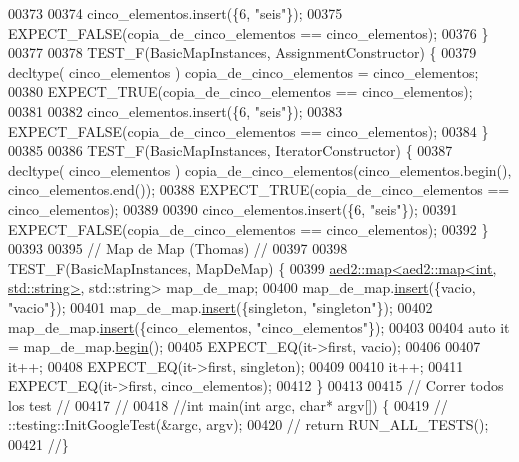 \begin{DoxyCode}
00373 
00374     cinco\_elementos.insert(\{6, \textcolor{stringliteral}{"seis"}\});
00375     EXPECT\_FALSE(copia\_de\_cinco\_elementos == cinco\_elementos);
00376 \}
00377 
00378 TEST\_F(BasicMapInstances, AssignmentConstructor) \{
00379     decltype( cinco\_elementos ) copia\_de\_cinco\_elementos = cinco\_elementos;
00380     EXPECT\_TRUE(copia\_de\_cinco\_elementos == cinco\_elementos);
00381 
00382     cinco\_elementos.insert(\{6, \textcolor{stringliteral}{"seis"}\});
00383     EXPECT\_FALSE(copia\_de\_cinco\_elementos == cinco\_elementos);
00384 \}
00385 
00386 TEST\_F(BasicMapInstances, IteratorConstructor) \{
00387     decltype( cinco\_elementos ) copia\_de\_cinco\_elementos(cinco\_elementos.begin(), cinco\_elementos.end());
00388     EXPECT\_TRUE(copia\_de\_cinco\_elementos == cinco\_elementos);
00389 
00390     cinco\_elementos.insert(\{6, \textcolor{stringliteral}{"seis"}\});
00391     EXPECT\_FALSE(copia\_de\_cinco\_elementos == cinco\_elementos);
00392 \}
00393 
00395 \textcolor{comment}{// Map de Map (Thomas) //}
00397 \textcolor{comment}{}
00398 TEST\_F(BasicMapInstances, MapDeMap) \{
00399     \hyperlink{classaed2_1_1map}{aed2::map<aed2::map<int, std::string>}, std::string> map\_de\_map;
00400     map\_de\_map.\hyperlink{classaed2_1_1map_a6941cde9a79c27f054b5c97a587a1854_a6941cde9a79c27f054b5c97a587a1854}{insert}(\{vacio, \textcolor{stringliteral}{"vacio"}\});
00401     map\_de\_map.\hyperlink{classaed2_1_1map_a6941cde9a79c27f054b5c97a587a1854_a6941cde9a79c27f054b5c97a587a1854}{insert}(\{singleton, \textcolor{stringliteral}{"singleton"}\});
00402     map\_de\_map.\hyperlink{classaed2_1_1map_a6941cde9a79c27f054b5c97a587a1854_a6941cde9a79c27f054b5c97a587a1854}{insert}(\{cinco\_elementos, \textcolor{stringliteral}{"cinco\_elementos"}\});
00403 
00404     \textcolor{keyword}{auto} it = map\_de\_map.\hyperlink{classaed2_1_1map_a58a95705d54b3dda7f775ce5a22225cb_a58a95705d54b3dda7f775ce5a22225cb}{begin}();
00405     EXPECT\_EQ(it->first, vacio);
00406 
00407     it++;
00408     EXPECT\_EQ(it->first, singleton);
00409 
00410     it++;
00411     EXPECT\_EQ(it->first, cinco\_elementos);
00412 \}
00413 
00415 \textcolor{comment}{// Correr todos los test //}
00417 \textcolor{comment}{}\textcolor{comment}{//}
00418 \textcolor{comment}{//int main(int argc, char* argv[]) \{}
00419 \textcolor{comment}{//  ::testing::InitGoogleTest(&argc, argv);}
00420 \textcolor{comment}{//  return RUN\_ALL\_TESTS();}
00421 \textcolor{comment}{//\}}
\end{DoxyCode}
